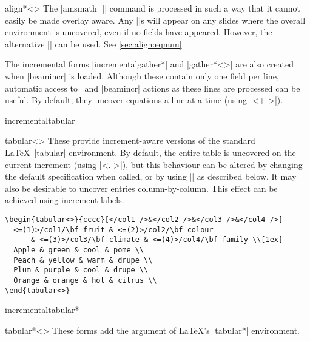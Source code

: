\documentclass[a4paper]{ltxdoc}
\begin{document}
\begin{environment}{{align*<>}}
    The |amsmath| |\tag| command is processed in such a way that it cannot
    easily be made overlay aware.  Any |\tag|s will appear on any slides where
    the overall environment is uncovered, even if no fields have appeared.
    However, the alternative |\eqtag| can be used.  See \cref{sec:align:eqnum}.
    
\end{environment}
%
The incremental forms |incrementalgather*| and |gather*<>| are also created when
|beamincr| is loaded.  Although these contain only one field per line, automatic
access to \beamer\ and |beamincr| actions as these lines are processed can be
useful.  By default, they uncover equations a line at a time (using |<+->|).

\begin{environment}{{incrementaltabular}}
\end{environment}
\begin{environment}{{tabular<>}}
  These provide increment-aware versions of the standard \LaTeX\ |tabular|
  environment.  By default, the entire table is uncovered on the current
  increment (using |<.->|), but this behaviour can be altered by changing the
  default specification when called, or by using |\setincrementalenvspec| as
  described below.  It may also be desirable to uncover entries
  column-by-column.  This effect can be achieved using increment labels.
  \example
\begin{verbatim}
\begin{tabular<>}{cccc}[</col1-/>&</col2-/>&</col3-/>&</col4-/>]
  <=(1)>/col1/\bf fruit & <=(2)>/col2/\bf colour  
      & <=(3)>/col3/\bf climate & <=(4)>/col4/\bf family \\[1ex]
  Apple & green & cool & pome \\
  Peach & yellow & warm & drupe \\
  Plum & purple & cool & drupe \\
  Orange & orange & hot & citrus \\
\end{tabular<>}  
\end{verbatim}
\end{environment}

\begin{environment}{{incrementaltabular*}}
\end{environment}
\begin{environment}{{tabular*<>}}
  These forms add the  argument of \LaTeX's |tabular*| environment.
\end{environment}
\end{document}
